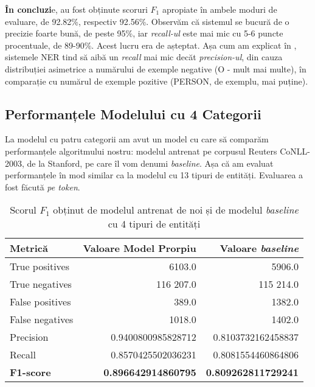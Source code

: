 \textbf{În concluzi}e, au fost obținute scoruri $F_1$ apropiate în ambele moduri de evaluare, de  92.82\%, respectiv 92.56\%. Observăm că sistemul se bucură de o precizie foarte bună, de peste 95\%, iar \textit{recall-ul} este mai mic cu 5-6 puncte procentuale, de 89-90\%. Acest lucru era de așteptat. Așa cum am explicat în , sistemele NER tind să aibă un \textit{recall} mai mic decăt \textit{precision-ul}, din cauza distribuției asimetrice a numărului de exemple negative (O - mult mai multe), în comparație cu numărul de exemple pozitive (PERSON, de exemplu, mai puține). 

\subsection{Performanțele Modelului cu 4 Categorii}

La modelul cu patru categorii am avut un model cu care să comparăm performanțele algoritmului nostru: modelul antrenat pe corpusul Reuters CoNLL-2003, de la Stanford, pe care îl vom denumi \textit{baseline}. Așa că am evaluat performanțele în mod similar ca la modelul cu 13 tipuri de entități. Evaluarea a fost făcută \textit{pe token}.

\begin{center}
\begin{table}[htb]
  \caption{Scorul $F_1$ obținut de modelul antrenat de noi și de modelul \textit{baseline} cu 4 tipuri de entități}
  \begin{tabular}{|l|r|r|}
  \hline
   Metrică & Valoare Model Prorpiu & Valoare \textit{baseline}\\
   \hline
  True positives & 6103.0 & 5906.0 \\
  True negatives & 116 207.0 & 115 214.0\\
  False positives & 389.0 & 1382.0 \\
  False negatives & 1018.0 & 1402.0\\
    \hline
  Precision &  0.9400800985828712 & 0.8103732162458837 \\
  Recall &  0.8570425502036231 & 0.8081554460864806 \\
  \hline
  \textbf{F1-score} & \textbf{0.896642914860795} & \textbf{0.809262811729241}\\
   \hline
   
  \end{tabular}
  \label{table:f1-score-5-class}
\end{table}
\end{center}

